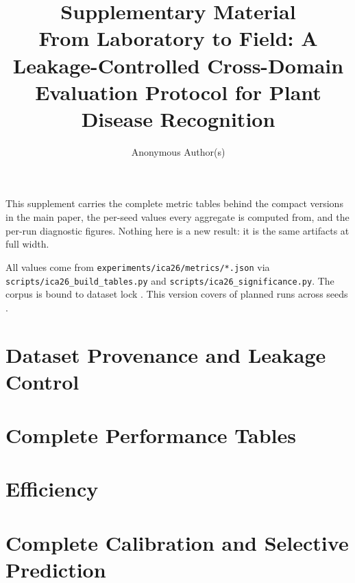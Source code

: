 \documentclass[runningheads]{llncs}
\begin{document}
\title{Supplementary Material\\
\large From Laboratory to Field: A Leakage-Controlled Cross-Domain
Evaluation Protocol for Plant Disease Recognition}

\author{Anonymous Author(s)}

\maketitle

\noindent
This supplement carries the complete metric tables behind the compact versions
in the main paper, the per-seed values every aggregate is computed from, and the
per-run diagnostic figures. Nothing here is a new result: it is the same
artifacts at full width.

All values come from \texttt{experiments/ica26/metrics/*.json} via
\texttt{scripts/ica26\_build\_tables.py} and
\texttt{scripts/ica26\_significance.py}. The corpus is bound to dataset lock
\LockDigest{}. This version covers \NRunsDone{} of \NRunsPlanned{} planned runs
across seeds \SeedList{}.

\section{Dataset Provenance and Leakage Control}



\section{Complete Performance Tables}





\section{Efficiency}



\section{Complete Calibration and Selective Prediction}
\end{document}
